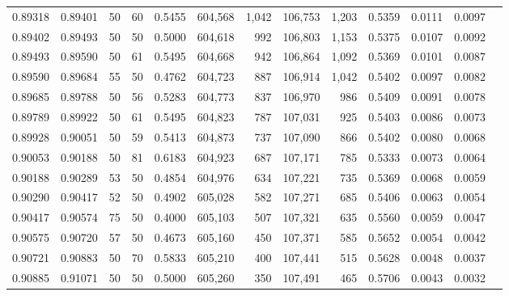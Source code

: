 \begin{tabular}{rrrrrrrrrrrrr}
0.89318 & 0.89401 &    50 &  60 &                                     0.5455 & 604,568 &   1,042 & 106,753 &   1,203 & 0.5359 & 0.0111 & 0.0097 \\
0.89402 & 0.89493 &    50 &  50 &                                     0.5000 & 604,618 &     992 & 106,803 &   1,153 & 0.5375 & 0.0107 & 0.0092 \\
0.89493 & 0.89590 &    50 &  61 &                                     0.5495 & 604,668 &     942 & 106,864 &   1,092 & 0.5369 & 0.0101 & 0.0087 \\
0.89590 & 0.89684 &    55 &  50 &                                     0.4762 & 604,723 &     887 & 106,914 &   1,042 & 0.5402 & 0.0097 & 0.0082 \\
0.89685 & 0.89788 &    50 &  56 &                                     0.5283 & 604,773 &     837 & 106,970 &     986 & 0.5409 & 0.0091 & 0.0078 \\
0.89789 & 0.89922 &    50 &  61 &                                     0.5495 & 604,823 &     787 & 107,031 &     925 & 0.5403 & 0.0086 & 0.0073 \\
0.89928 & 0.90051 &    50 &  59 &                                     0.5413 & 604,873 &     737 & 107,090 &     866 & 0.5402 & 0.0080 & 0.0068 \\
0.90053 & 0.90188 &    50 &  81 &                                     0.6183 & 604,923 &     687 & 107,171 &     785 & 0.5333 & 0.0073 & 0.0064 \\
0.90188 & 0.90289 &    53 &  50 &                                     0.4854 & 604,976 &     634 & 107,221 &     735 & 0.5369 & 0.0068 & 0.0059 \\
0.90290 & 0.90417 &    52 &  50 &                                     0.4902 & 605,028 &     582 & 107,271 &     685 & 0.5406 & 0.0063 & 0.0054 \\
0.90417 & 0.90574 &    75 &  50 &                                     0.4000 & 605,103 &     507 & 107,321 &     635 & 0.5560 & 0.0059 & 0.0047 \\
0.90575 & 0.90720 &    57 &  50 &                                     0.4673 & 605,160 &     450 & 107,371 &     585 & 0.5652 & 0.0054 & 0.0042 \\
0.90721 & 0.90883 &    50 &  70 &                                     0.5833 & 605,210 &     400 & 107,441 &     515 & 0.5628 & 0.0048 & 0.0037 \\
0.90885 & 0.91071 &    50 &  50 &                                     0.5000 & 605,260 &     350 & 107,491 &     465 & 0.5706 & 0.0043 & 0.0032 \\

\end{tabular}
